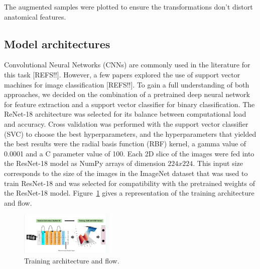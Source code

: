 \begin{itemize}
\end{itemize}

The augmented samples were plotted to ensure the transformations don't distort anatomical features.

%
\subsection{Model architectures}

Convolutional Neural Networks (CNNs) are commonly used in the literature for this task [REFS!!]. However, a few papers explored the use of support vector machines for image classification [REFS!!]. To gain a full understanding of both approaches, we decided on the combination of a pretrained deep neural network for feature extraction and a support vector classifier for binary classification. The ReNet-18 architecture was selected for its balance between computational load and accuracy. Cross validation was performed with the support vector classifier (SVC) to choose the best hyperparameters, and the hyperparameters that yielded the best results were the radial basis function (RBF) kernel, a gamma value of 0.0001 and a C parameter value of 100. Each 2D slice of the images were fed into the ResNet-18 model as NumPy arrays of dimension $224x224$. This input size corresponds to the size of the images in the ImageNet dataset that was used to train ResNet-18 and was selected for compatibility with the pretrained weights of the ResNet-18 model. Figure~\ref{fig:training_architecture} gives a representation of the training architecture and flow.
%
\begin{figure}
    \centering
    \includegraphics[width=0.4\textwidth]{./figs/model_architecture.png} %
    \caption{Training architecture and flow.}\label{fig:training_architecture}
\end{figure}

